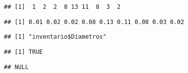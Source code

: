 \documentclass[
]{article}
\newenvironment{Shaded}{\begin{snugshade}}{\end{snugshade}}
\newcommand{\NormalTok}[1]{#1}
\newcommand{\SpecialCharTok}[1]{\textcolor[rgb]{0.00,0.00,0.00}{#1}}
\begin{document}
\begin{verbatim}
## [1]  1  2  2  8 13 11  8  3  2
\end{verbatim}

\begin{Shaded}
\end{Shaded}

\begin{verbatim}
## [1] 0.01 0.02 0.02 0.08 0.13 0.11 0.08 0.03 0.02
\end{verbatim}

\begin{Shaded}
\end{Shaded}

\begin{verbatim}
## [1] "inventario$Diametros"
\end{verbatim}

\begin{Shaded}
\end{Shaded}

\begin{verbatim}
## [1] TRUE
\end{verbatim}

\begin{Shaded}
\end{Shaded}

\begin{verbatim}
## NULL
\end{verbatim}
\end{document}
